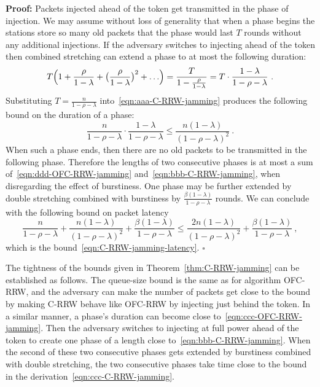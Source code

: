 \documentclass[11pt]{article}
\newcommand{\qed}{\hfill $\square$}
\newenvironment{proof}{\noindent\textbf{Proof: }}{\qed \smallbreak}
\begin{document}
\begin{proof}
Packets injected ahead of the token get transmitted in the phase of injection.
We may assume without loss of generality that when a phase begins the stations store so many old packets that the phase would last $T$ rounds without any additional injections.
If the adversary switches to injecting ahead of the token then combined stretching can extend a phase to at most the following duration:
\begin{equation}
\label{eqn:aaa-C-RRW-jamming}
T \Bigl(1+ \frac{\rho}{1-\lambda}+  \bigl(\frac{\rho}{1-\lambda}\bigr)^2  +\ldots \Bigr)
=  
\frac{T}{1-\frac{\rho}{1-\lambda}}
=
T\cdot\frac{1-\lambda}{1-\rho-\lambda}
\ .
\end{equation}
Substituting $T=\frac{n}{1-\rho-\lambda}$ into~\eqref{eqn:aaa-C-RRW-jamming} produces the following bound on the duration of a phase:
\begin{equation}
\label{eqn:bbb-C-RRW-jamming}
\frac{n}{1-\rho-\lambda}\cdot\frac{1-\lambda}{1-\rho-\lambda}
\le
\frac{n(1-\lambda)}{(1-\rho-\lambda)^2}
\ .
\end{equation}
When such a phase ends, then there are no old packets to be transmitted in the following phase.
Therefore the  lengths of two consecutive phases is at most a sum of~\eqref{eqn:ddd-OFC-RRW-jamming} and~\eqref{eqn:bbb-C-RRW-jamming}, when disregarding the effect of burstiness.
One phase may be further extended by double stretching combined with burstiness by $\frac{\beta(1-\lambda)}{1-\rho-\lambda}$ rounds.
We can conclude with the following bound on packet latency
\begin{equation}
\label{eqn:ccc-C-RRW-jamming}
\frac{n}{1-\rho-\lambda}+\frac{n(1-\lambda)}{(1-\rho-\lambda)^2} + \frac{\beta(1-\lambda)}{1-\rho-\lambda}
\le 
\frac{2n(1-\lambda)}{(1-\rho-\lambda)^2} + \frac{\beta(1-\lambda)}{1-\rho-\lambda} 
\ ,
\end{equation}
which is the bound~\eqref{eqn:C-RRW-jamming-latency}.
\end{proof}

The tightness of the  bounds given in Theorem~\ref{thm:C-RRW-jamming} can be established as follows. 
The queue-size bound is the same as for algorithm \textsc{OFC-RRW}, and the adversary can make the number of packets get close to the bound by making \textsc{C-RRW} behave like \textsc{OFC-RRW} by injecting just behind the token.
In a similar manner, a phase's duration can become close to~\eqref{eqn:ccc-OFC-RRW-jamming}.
Then the adversary switches to injecting at full power  ahead of the token to create one phase of a length close to~\eqref{eqn:bbb-C-RRW-jamming}.
When the second of these two consecutive phases gets extended by burstiness combined with double stretching, the two consecutive phases take time close to the bound in the derivation~\eqref{eqn:ccc-C-RRW-jamming}.
\end{document}
